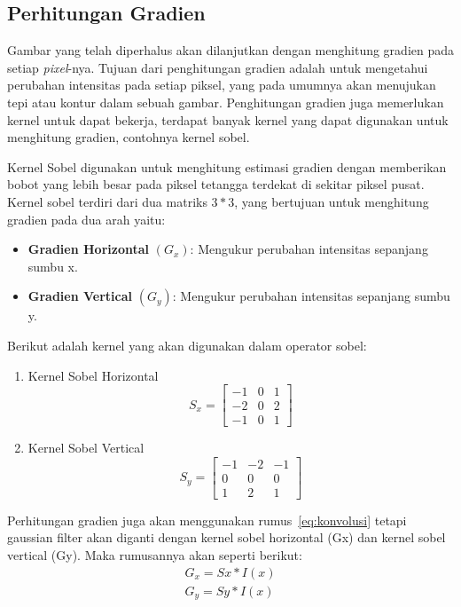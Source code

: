 \subsection{Perhitungan Gradien}
    Gambar yang telah diperhalus akan dilanjutkan dengan menghitung gradien pada setiap \emph{pixel}-nya. Tujuan dari penghitungan gradien adalah untuk mengetahui perubahan intensitas pada setiap piksel, yang pada umumnya akan menujukan tepi atau kontur dalam sebuah gambar.
Penghitungan gradien juga memerlukan kernel untuk dapat bekerja, terdapat banyak kernel yang dapat digunakan untuk menghitung gradien, contohnya kernel sobel. 

    Kernel Sobel digunakan untuk menghitung estimasi gradien dengan memberikan bobot yang lebih besar pada piksel tetangga terdekat di sekitar piksel pusat.
Kernel sobel terdiri dari dua matriks \(3*3\), yang bertujuan untuk menghitung gradien pada dua arah yaitu:
 \begin{itemize}
    \item \textbf{Gradien Horizontal} \((G_{x})\): Mengukur perubahan intensitas sepanjang sumbu x.
    \item \textbf{Gradien Vertical} \((G_{y})\): Mengukur perubahan intensitas sepanjang sumbu y.
\end{itemize}
    Berikut adalah kernel yang akan digunakan dalam operator sobel:
\begin{enumerate}
    \setlength{\parskip}{0pt}
    \item Kernel Sobel Horizontal
    \begin{equation*}
        S_{x} = 
        \begin{bmatrix}
            -1 & 0 & 1 \\
            -2 & 0 & 2 \\
            -1 & 0 & 1
          \end{bmatrix}
    \end{equation*}

    \item  Kernel Sobel Vertical
    \begin{equation*}
        S_{y} = 
        \begin{bmatrix}
            -1 & -2 & -1 \\
            0 & 0 & 0 \\
            1 & 2 & 1
          \end{bmatrix}
    \end{equation*}

\end{enumerate}
Perhitungan gradien juga akan menggunakan rumus~\eqref{eq:konvolusi} tetapi gaussian filter akan diganti dengan kernel sobel horizontal (Gx) dan kernel sobel vertical (Gy).
Maka rumusannya akan seperti berikut:
\begin{equation}
    \begin{aligned}
        G_{x} = Sx * I(x)\\ G_{y} = Sy * I(x)
    \end{aligned}
\end{equation}


